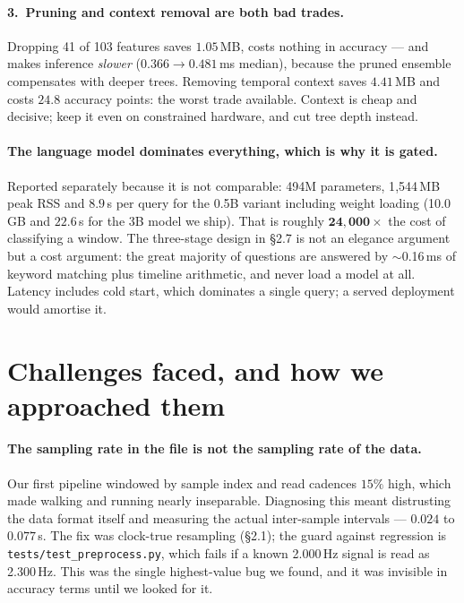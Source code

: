\documentclass[11pt,a4paper]{article}
\newcommand{\code}[1]{\texttt{\small #1}}
\begin{document}
\paragraph{3.\ Pruning and context removal are both bad trades.} Dropping 41 of 103
features saves $1.05$\,MB, costs nothing in accuracy --- and makes inference
\emph{slower} ($0.366 \rightarrow 0.481$\,ms median), because the pruned ensemble
compensates with deeper trees. Removing temporal context saves $4.41$\,MB and costs
$24.8$ accuracy points: the worst trade available. Context is cheap and decisive; keep it
even on constrained hardware, and cut tree depth instead.

\paragraph{The language model dominates everything, which is why it is gated.} Reported
separately because it is not comparable: 494M parameters, 1{,}544\,MB peak RSS and
$8.9$\,s per query for the 0.5B variant including weight loading (10.0\,GB and $22.6$\,s
for the 3B model we ship). That is roughly $\mathbf{24{,}000\times}$ the cost of
classifying a window. The three-stage design in \S2.7 is not an elegance argument but a
cost argument: the great majority of questions are answered by $\sim$0.16\,ms of keyword
matching plus timeline arithmetic, and never load a model at all. Latency includes cold
start, which dominates a single query; a served deployment would amortise it.

\section{Challenges faced, and how we approached them}

\paragraph{The sampling rate in the file is not the sampling rate of the data.} Our first
pipeline windowed by sample index and read cadences $15\%$ high, which made walking and
running nearly inseparable. Diagnosing this meant distrusting the data format itself and
measuring the actual inter-sample intervals --- $0.024$ to $0.077$\,s. The fix was
clock-true resampling (\S2.1); the guard against regression is
\code{tests/test\_preprocess.py}, which fails if a known 2.000\,Hz signal is read as
2.300\,Hz. This was the single highest-value bug we found, and it was invisible in
accuracy terms until we looked for it.
\end{document}
